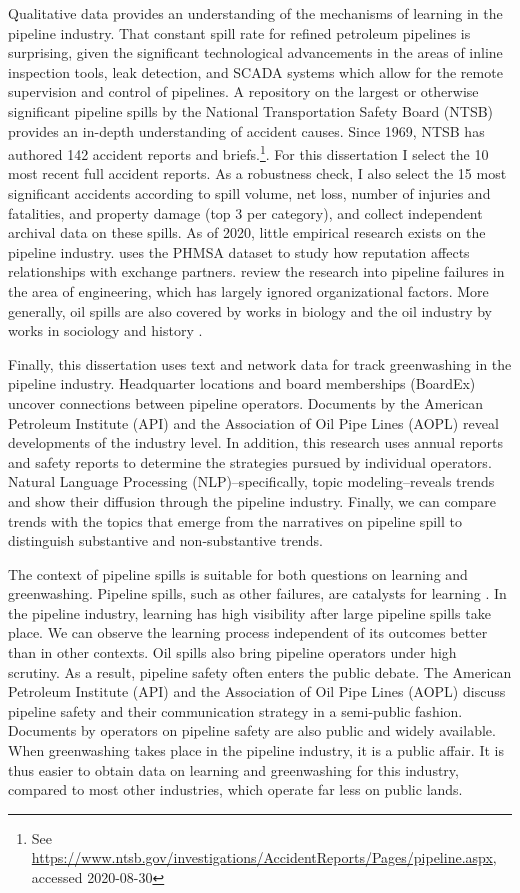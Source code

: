 Qualitative data provides an understanding of the mechanisms of learning in the pipeline industry. That constant spill rate for refined petroleum pipelines is surprising, given the significant technological advancements in the areas of inline inspection tools, leak detection, and SCADA systems which allow for the remote supervision and control of pipelines. A repository on the largest or otherwise significant pipeline spills by the National Transportation Safety Board (NTSB) provides an in-depth understanding of accident causes. Since 1969, NTSB has authored 142 accident reports and briefs.\footnote{See \url{https://www.ntsb.gov/investigations/AccidentReports/Pages/pipeline.aspx}, accessed 2020-08-30}. For this dissertation I select the 10 most recent full accident reports. As a robustness check, I also select the 15 most significant accidents according to spill volume, net loss, number of injuries and fatalities, and property damage (top 3 per category), and collect independent archival data on these spills. As of 2020, little empirical research exists on the pipeline industry. \citet{Park2019} uses the PHMSA dataset to study how reputation affects relationships with exchange partners. \citet{Zakikhani2020} review the research into pipeline failures in the area of engineering, which has largely ignored organizational factors. More generally, oil spills are also covered by works in biology \citep[in particular][]{Burger1997} and the oil industry by works in sociology and history \citep[e.g.,][]{Dochuk2019}.

Finally, this dissertation uses text and network data for track greenwashing in the pipeline industry. Headquarter locations and board memberships (BoardEx) uncover connections between pipeline operators. Documents by the American Petroleum Institute (API) and the Association of Oil Pipe Lines (AOPL) reveal developments of the industry level. In addition, this research uses annual reports and safety reports to determine the strategies pursued by individual operators. Natural Language Processing (NLP)--specifically, topic modeling--reveals trends and show their diffusion through the pipeline industry. Finally, we can compare trends with the topics that emerge from the narratives on pipeline spill to distinguish substantive and non-substantive trends.

The context of pipeline spills is suitable for both questions on learning and greenwashing. Pipeline spills, such as other failures, are catalysts for learning \citep{March1991}. In the pipeline industry, learning has high visibility after large pipeline spills take place. We can observe the learning process independent of its outcomes better than in other contexts. Oil spills also bring pipeline operators under high scrutiny. As a result, pipeline safety often enters the public debate. The American Petroleum Institute (API) and the Association of Oil Pipe Lines (AOPL) discuss pipeline safety and their communication strategy in a semi-public fashion. Documents by operators on pipeline safety are also public and widely available. When greenwashing takes place in the pipeline industry, it is a public affair. It is thus easier to obtain data on learning and greenwashing for this industry, compared to most other industries, which operate far less on public lands.

